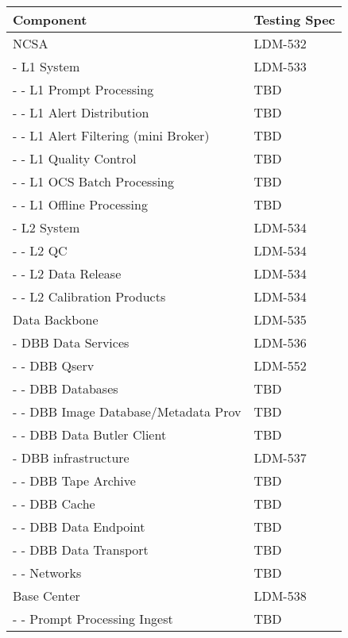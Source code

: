 

\begin{longtable}{|p{}|p{}|}\hline
\textbf{Component} & \textbf{Testing Spec}\\ \hline
\rowcolor{orange}
NCSA  & LDM-532 \\ \hline
\rowcolor{yellow}
- L1 System & LDM-533 \\ \hline
- - L1 Prompt Processing & TBD \\ \hline
- - L1 Alert Distribution & TBD \\ \hline
- - L1 Alert Filtering (mini Broker) & TBD \\ \hline
- - L1 Quality Control & TBD \\ \hline
- - L1 OCS Batch Processing & TBD \\ \hline
- - L1 Offline Processing & TBD \\ \hline
\rowcolor{yellow}
- L2 System & LDM-534 \\ \hline
- - L2 QC & LDM-534 \\ \hline
- - L2 Data Release & LDM-534 \\ \hline
- - L2 Calibration Products & LDM-534 \\ \hline
\rowcolor{orange}
Data Backbone & LDM-535 \\ \hline
\rowcolor{yellow}
- DBB Data Services & LDM-536 \\ \hline
- - DBB Qserv & LDM-552 \\ \hline
- - DBB Databases & TBD \\ \hline
- - DBB Image Database/Metadata Prov & TBD \\ \hline
- - DBB Data Butler Client & TBD \\ \hline
\rowcolor{yellow}
- DBB infrastructure & LDM-537 \\ \hline
- - DBB Tape Archive & TBD \\ \hline
- - DBB Cache & TBD \\ \hline
- - DBB Data Endpoint & TBD \\ \hline
- - DBB Data Transport & TBD \\ \hline
- - Networks  & TBD \\ \hline
\rowcolor{orange}
Base Center & LDM-538 \\ \hline
- - Prompt Processing Ingest  & TBD \\ \hline

\end{longtable}
